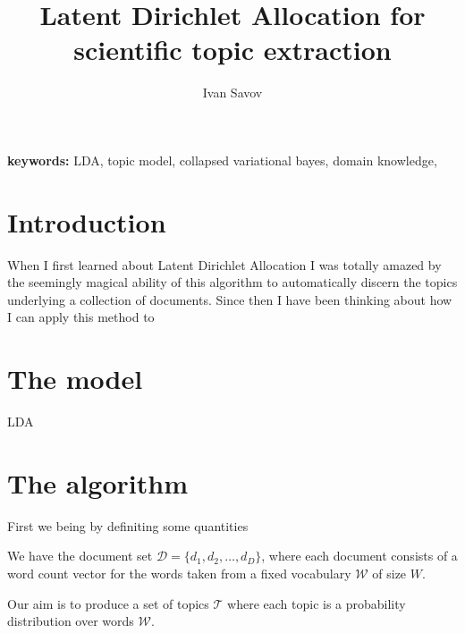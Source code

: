 \documentclass[11pt]{article}
\author{Ivan Savov}
\title{ {\Huge Latent Dirichlet Allocation for \\ scientific topic extraction } }
\newcommand{\DD}{\mathcal{D}}
\newcommand{\WW}{\mathcal{W}}
\newcommand{\TT}{\mathcal{T}}
\begin{document}
\maketitle



{\bf keywords: } LDA, topic model, collapsed variational bayes, domain knowledge, 



\section{Introduction}

	When I first learned about Latent Dirichlet Allocation I was totally amazed by the seemingly magical ability
	of this algorithm to automatically discern the topics underlying a collection of documents.
	Since then I have been thinking about how I can apply this method to  


\section{The model}

    LDA 

\section{The algorithm}

    First we being by definiting some quantities
    
    We have the document set $\DD = \{ d_1, d_2, \ldots, d_D \}$, where each document consists of 
    a word count vector for the words taken from a fixed vocabulary $\WW$ of size $W$.
    
    Our aim is to produce a set of topics $\TT$ where each topic is a probability distribution over words $\WW$.
    
\end{document}
